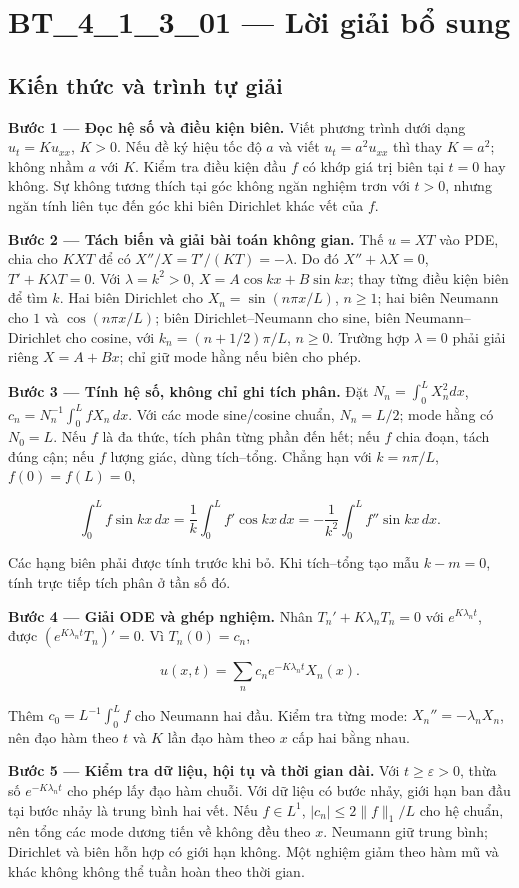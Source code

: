 \documentclass[10pt,a4paper]{article}
\begin{document}
\section*{BT\_4\_1\_3\_01 — Lời giải bổ sung}
\subsection*{Kiến thức và trình tự giải}
\textbf{Bước 1 — Đọc hệ số và điều kiện biên.} Viết phương trình dưới dạng $u_t=Ku_{xx}$, $K>0$. Nếu đề ký hiệu tốc độ $a$ và viết $u_t=a^2u_{xx}$ thì thay $K=a^2$; không nhầm $a$ với $K$. Kiểm tra điều kiện đầu $f$ có khớp giá trị biên tại $t=0$ hay không. Sự không tương thích tại góc không ngăn nghiệm trơn với $t>0$, nhưng ngăn tính liên tục đến góc khi biên Dirichlet khác vết của $f$.

\textbf{Bước 2 — Tách biến và giải bài toán không gian.} Thế $u=XT$ vào PDE, chia cho $KXT$ để có $X''/X=T'/(KT)=-\lambda$. Do đó $X''+\lambda X=0$, $T'+K\lambda T=0$. Với $\lambda=k^2>0$, $X=A\cos kx+B\sin kx$; thay từng điều kiện biên để tìm $k$. Hai biên Dirichlet cho $X_n=\sin(n\pi x/L)$, $n\ge1$; hai biên Neumann cho $1$ và $\cos(n\pi x/L)$; biên Dirichlet–Neumann cho sine, biên Neumann–Dirichlet cho cosine, với $k_n=(n+1/2)\pi/L$, $n\ge0$. Trường hợp $\lambda=0$ phải giải riêng $X=A+Bx$; chỉ giữ mode hằng nếu biên cho phép.

\textbf{Bước 3 — Tính hệ số, không chỉ ghi tích phân.} Đặt $N_n=\int_0^L X_n^2dx$, $c_n=N_n^{-1}\int_0^L fX_n\,dx$. Với các mode sine/cosine chuẩn, $N_n=L/2$; mode hằng có $N_0=L$. Nếu $f$ là đa thức, tích phân từng phần đến hết; nếu $f$ chia đoạn, tách đúng cận; nếu $f$ lượng giác, dùng tích–tổng. Chẳng hạn với $k=n\pi/L$, $f(0)=f(L)=0$,


\[
\int_0^Lf\sin kx\,dx=\frac1k\int_0^Lf'\cos kx\,dx
=-\frac1{k^2}\int_0^Lf''\sin kx\,dx.
\]


Các hạng biên phải được tính trước khi bỏ. Khi tích–tổng tạo mẫu $k-m=0$, tính trực tiếp tích phân ở tần số đó.

\textbf{Bước 4 — Giải ODE và ghép nghiệm.} Nhân $T_n'+K\lambda_nT_n=0$ với $e^{K\lambda_nt}$, được $(e^{K\lambda_nt}T_n)'=0$. Vì $T_n(0)=c_n$,


\[
u(x,t)=\sum_n c_ne^{-K\lambda_nt}X_n(x).
\]


Thêm $c_0=L^{-1}\int_0^Lf$ cho Neumann hai đầu. Kiểm tra từng mode: $X_n''=-\lambda_nX_n$, nên đạo hàm theo $t$ và $K$ lần đạo hàm theo $x$ cấp hai bằng nhau.

\textbf{Bước 5 — Kiểm tra dữ liệu, hội tụ và thời gian dài.} Với $t\ge\varepsilon>0$, thừa số $e^{-K\lambda_nt}$ cho phép lấy đạo hàm chuỗi. Với dữ liệu có bước nhảy, giới hạn ban đầu tại bước nhảy là trung bình hai vết. Nếu $f\in L^1$, $|c_n|\le2\|f\|_1/L$ cho hệ chuẩn, nên tổng các mode dương tiến về không đều theo $x$. Neumann giữ trung bình; Dirichlet và biên hỗn hợp có giới hạn không. Một nghiệm giảm theo hàm mũ và khác không không thể tuần hoàn theo thời gian.
\end{document}
